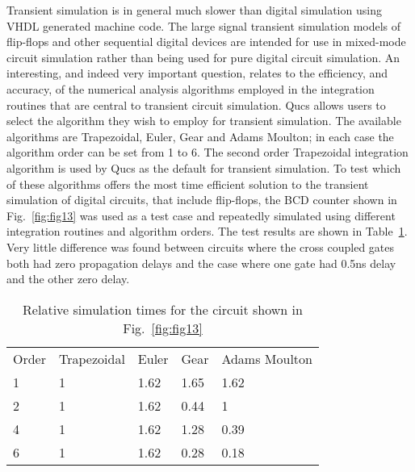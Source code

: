 
Transient simulation is in general much slower than digital simulation
using VHDL generated machine code. The large signal transient
simulation models of flip-flops and other sequential digital devices
are intended for use in mixed-mode circuit simulation rather than
being used for pure digital circuit simulation.  An interesting, and
indeed very important question, relates to the efficiency, and
accuracy, of the numerical analysis algorithms employed in the
integration routines that are central to transient circuit simulation.
Qucs allows users to select the algorithm they wish to employ for
transient simulation.  The available algorithms are Trapezoidal,
Euler, Gear and Adams Moulton; in each case the algorithm order can be
set from 1 to 6. The second order Trapezoidal integration algorithm is
used by Qucs as the default for transient simulation. To test which of
these algorithms offers the most time efficient solution to the
transient simulation of digital circuits, that include flip-flops, the
BCD counter shown in Fig.~\ref{fig:fig13} was used as a test case and
repeatedly simulated using different integration routines and
algorithm orders. The test results are shown in Table~\ref{tab:tab2}.
Very little difference was found between circuits where the cross
coupled gates both had zero propagation delays and the case where one
gate had 0.5ns delay and the other zero delay.

\begin{table}
\begin{center}
\begin{tabular}{lllll}
Order & Trapezoidal & Euler & Gear & Adams Moulton \\ 
1 & 1 & 1.62 & 1.65 & 1.62 \\ 
2 & 1 & 1.62 & 0.44 & 1 \\ 
4 & 1 & 1.62 & 1.28 & 0.39 \\ 
6 & 1 & 1.62 & 0.28 & 0.18 
\end{tabular}
\end{center}
\caption{Relative simulation times for the circuit shown in Fig.~\ref{fig:fig13}}
\label{tab:tab2}
\end{table}

\addvspace{12pt}

